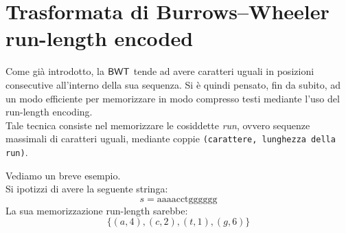 \section{Trasformata di Burrows--Wheeler run-length encoded}
Come già introdotto, la $\mbox{\rm {\sf BWT}}$ tende ad avere caratteri uguali in
posizioni consecutive all'interno della sua sequenza. Si è quindi 
pensato, fin da subito, ad un modo efficiente per memorizzare in modo compresso
testi mediante l'uso del run-length encoding. \\
Tale tecnica consiste nel
memorizzare le cosiddette \textit{run}, ovvero sequenze massimali di caratteri
uguali, mediante coppie \texttt{(carattere, lunghezza della run)}.
\begin{esempio}
  Vediamo un breve esempio.\\
  Si ipotizzi di avere la seguente stringa:
  \[s=\mbox{aaaacctgggggg}\]
  La sua memorizzazione run-length sarebbe:
  \[\{(a,4),(c,2),(t,1),(g,6)\}\]
\end{esempio}
